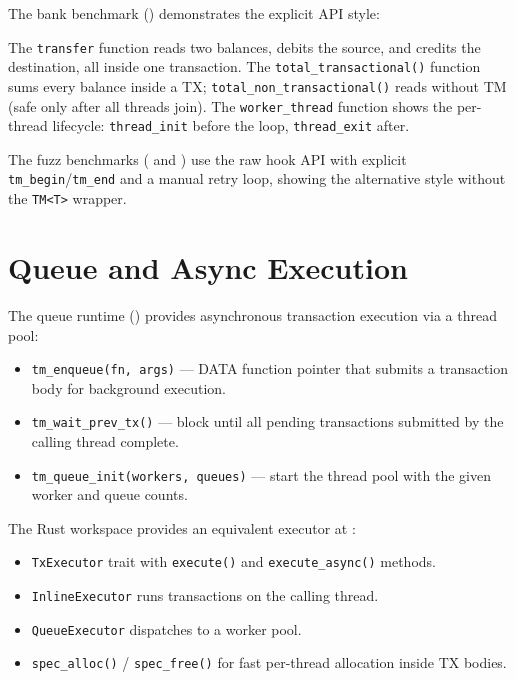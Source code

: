 The bank benchmark () demonstrates the
explicit API style:



The \texttt{transfer} function reads two balances, debits the source, and
credits the destination, all inside one transaction.  The
\texttt{total\_transactional()} function sums every balance inside a TX;
\texttt{total\_non\_transactional()} reads without TM (safe only after all
threads join).  The \texttt{worker\_thread} function shows the per-thread
lifecycle: \texttt{thread\_init} before the loop, \texttt{thread\_exit}
after.

The fuzz benchmarks ( and
) use the raw hook API with explicit
\texttt{tm\_begin}/\texttt{tm\_end} and a manual retry loop, showing the
alternative style without the \texttt{TM<T>} wrapper.

\section{Queue and Async Execution}
\label{sec:repo-queue}

The queue runtime () provides
asynchronous transaction execution via a thread pool:

\begin{itemize}
    \item \texttt{tm\_enqueue(fn, args)} --- DATA function pointer that
          submits a transaction body for background execution.
    \item \texttt{tm\_wait\_prev\_tx()} --- block until all pending
          transactions submitted by the calling thread complete.
    \item \texttt{tm\_queue\_init(workers, queues)} --- start the thread
          pool with the given worker and queue counts.
\end{itemize}

The Rust workspace provides an equivalent executor at
:

\begin{itemize}
    \item \texttt{TxExecutor} trait with \texttt{execute()} and
          \texttt{execute\_async()} methods.
    \item \texttt{InlineExecutor} runs transactions on the calling thread.
    \item \texttt{QueueExecutor} dispatches to a worker pool.
    \item \texttt{spec\_alloc()} / \texttt{spec\_free()} for fast
          per-thread allocation inside TX bodies.
\end{itemize}

